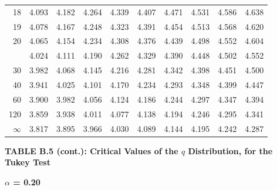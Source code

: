 \documentclass[10pt]{article}
\begin{document}
\begin{longtable}{@{}r!{\vrule width 0.8pt\hspace{0.55em}}rrrrrrrrr@{}}
18 & 4.093 & 4.182 & 4.264 & 4.339 & 4.407 & 4.471 & 4.531 & 4.586 & 4.638 \\
19 & 4.078 & 4.167 & 4.248 & 4.323 & 4.391 & 4.454 & 4.513 & 4.568 & 4.620 \\
20 & 4.065 & 4.154 & 4.234 & 4.308 & 4.376 & 4.439 & 4.498 & 4.552 & 4.604 \\
 & 4.024 & 4.111 & 4.190 & 4.262 & 4.329 & 4.390 & 4.448 & 4.502 & 4.552 \\
30 & 3.982 & 4.068 & 4.145 & 4.216 & 4.281 & 4.342 & 4.398 & 4.451 & 4.500 \\
40 & 3.941 & 4.025 & 4.101 & 4.170 & 4.234 & 4.293 & 4.348 & 4.399 & 4.447 \\
60 & 3.900 & 3.982 & 4.056 & 4.124 & 4.186 & 4.244 & 4.297 & 4.347 & 4.394 \\
120 & 3.859 & 3.938 & 4.011 & 4.077 & 4.138 & 4.194 & 4.246 & 4.295 & 4.341 \\
\addlinespace[0.30em]
$\infty$ & 3.817 & 3.895 & 3.966 & 4.030 & 4.089 & 4.144 & 4.195 & 4.242 & 4.287 \\
\end{longtable}
\newpage
\thispagestyle{empty}
\begin{center}
{\large\bfseries TABLE B.5 (cont.): Critical Values of the $q$ Distribution, for the Tukey Test\par}
\end{center}
{\large\bfseries $\alpha$ = 0.20\par}
\vspace{0.45em}
\small
\end{document}
